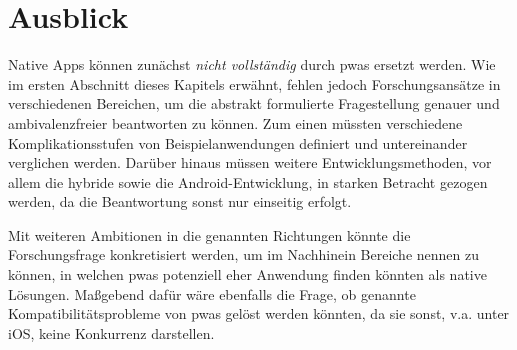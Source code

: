 \section{Ausblick}
Native Apps können zunächst \textit{nicht vollständig} durch \acp{pwa} ersetzt werden. Wie im ersten Abschnitt dieses Kapitels erwähnt, fehlen jedoch Forschungsansätze in verschiedenen Bereichen, um die abstrakt formulierte Fragestellung genauer und ambivalenzfreier beantworten zu können. Zum einen müssten verschiedene Komplikationsstufen von Beispielanwendungen definiert und untereinander verglichen werden. Darüber hinaus müssen weitere Entwicklungsmethoden, vor allem die hybride sowie die Android-Entwicklung, in starken Betracht gezogen werden, da die Beantwortung sonst nur einseitig erfolgt.

Mit weiteren Ambitionen in die genannten Richtungen könnte die Forschungsfrage konkretisiert werden, um im Nachhinein Bereiche nennen zu können, in welchen \acp{pwa} potenziell eher Anwendung finden könnten als native Lösungen. Maßgebend dafür wäre ebenfalls die Frage, ob genannte Kompatibilitätsprobleme von \acp{pwa} gelöst werden könnten, da sie sonst, v.a. unter iOS, keine Konkurrenz darstellen.